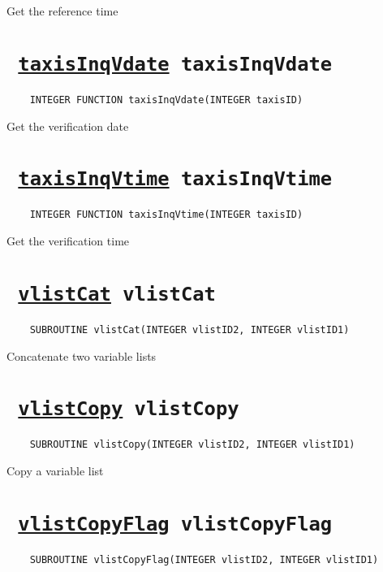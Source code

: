 Get the reference time
\ifpdfoutput{}{(\ref{taxisInqRtime})}


\section*{\texttt{ 
\ifpdf
\hyperref[taxisInqVdate]{taxisInqVdate}
\else
taxisInqVdate
\fi
}}
\begin{verbatim}
    INTEGER FUNCTION taxisInqVdate(INTEGER taxisID)
\end{verbatim}

Get the verification date
\ifpdfoutput{}{(\ref{taxisInqVdate})}


\section*{\texttt{ 
\ifpdf
\hyperref[taxisInqVtime]{taxisInqVtime}
\else
taxisInqVtime
\fi
}}
\begin{verbatim}
    INTEGER FUNCTION taxisInqVtime(INTEGER taxisID)
\end{verbatim}

Get the verification time
\ifpdfoutput{}{(\ref{taxisInqVtime})}


\section*{\texttt{ 
\ifpdf
\hyperref[vlistCat]{vlistCat}
\else
vlistCat
\fi
}}
\begin{verbatim}
    SUBROUTINE vlistCat(INTEGER vlistID2, INTEGER vlistID1)
\end{verbatim}

Concatenate two variable lists
\ifpdfoutput{}{(\ref{vlistCat})}


\section*{\texttt{ 
\ifpdf
\hyperref[vlistCopy]{vlistCopy}
\else
vlistCopy
\fi
}}
\begin{verbatim}
    SUBROUTINE vlistCopy(INTEGER vlistID2, INTEGER vlistID1)
\end{verbatim}

Copy a variable list
\ifpdfoutput{}{(\ref{vlistCopy})}


\section*{\texttt{ 
\ifpdf
\hyperref[vlistCopyFlag]{vlistCopyFlag}
\else
vlistCopyFlag
\fi
}}
\begin{verbatim}
    SUBROUTINE vlistCopyFlag(INTEGER vlistID2, INTEGER vlistID1)
\end{verbatim}

